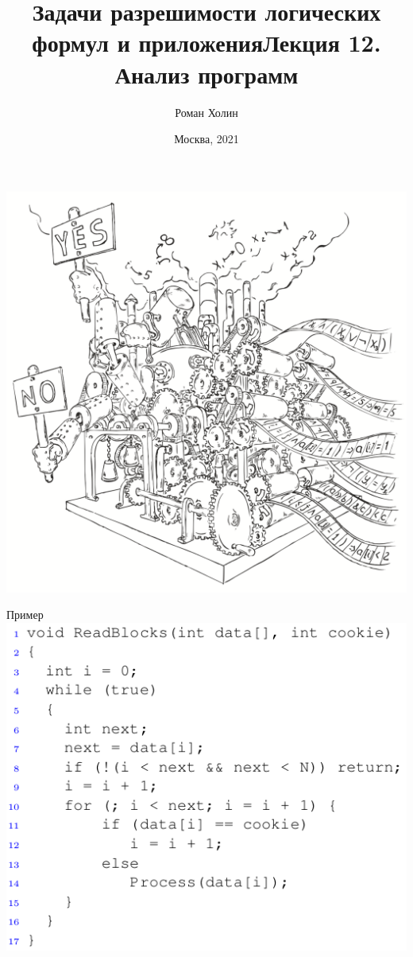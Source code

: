 \documentclass{beamer}
\begin{document}
\title{Задачи разрешимости логических формул и приложения\newline Лекция 12. Анализ программ}
\author{Роман Холин}
\date{Москва, 2021}

\begin{frame}
\includegraphics[scale=0.5]{../decision-procedure.png}
\end{frame}

\frame{\titlepage}

\begin{frame}{Пример}
\includegraphics[scale=0.5]{example1.png}
\end{frame}
\end{document}

